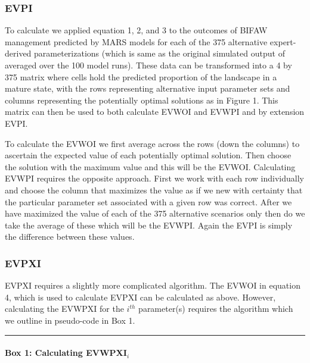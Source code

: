 \documentclass[]{article}
\let\oldparagraph\paragraph
\renewcommand{\paragraph}[1]{\oldparagraph{#1}\mbox{}}
\begin{document}
\subsubsection{EVPI}\label{evpi}

To calculate we applied equation 1, 2, and 3 to the outcomes of BIFAW
management predicted by MARS models for each of the 375 alternative
expert-derived parameterizations (which is same as the original
simulated output of \citet{Czembor2011} averaged over the 100 model
runs). These data can be transformed into a 4 by 375 matrix where cells
hold the predicted proportion of the landscape in a mature state, with
the rows representing alternative input parameter sets and columns
representing the potentially optimal solutions as in Figure 1. This
matrix can then be used to both calculate EVWOI and EVWPI and by
extension EVPI.

To calculate the EVWOI we first average across the rows (down the
columns) to ascertain the expected value of each potentially optimal
solution. Then choose the solution with the maximum value and this will
be the EVWOI. Calculating EVWPI requires the opposite approach. First we
work with each row individually and choose the column that maximizes the
value as if we new with certainty that the particular parameter set
associated with a given row was correct. After we have maximized the
value of each of the 375 alternative scenarios only then do we take the
average of these which will be the EVWPI. Again the EVPI is simply the
difference between these values.

\subsubsection{EVPXI}\label{evpxi}

EVPXI requires a slightly more complicated algorithm. The EVWOI in
equation 4, which is used to calculate EVPXI can be calculated as above.
However, calculating the EVWPXI for the \(i^{th}\) parameter(s) requires
the algorithm which we outline in pseudo-code in Box 1.

\begin{center}\rule{0.5\linewidth}{\linethickness}\end{center}

\paragraph{\texorpdfstring{Box 1: Calculating
EVWPXI\(_i\)}{Box 1: Calculating EVWPXI\_i}}\label{box-1-calculating-evwpxiux5fi}
\end{document}
